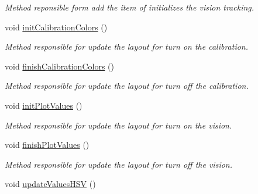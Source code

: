 \begin{DoxyCompactItemize}
\begin{DoxyCompactList}\small\item\em Method reponsible form add the item of initializes the vision tracking. \end{DoxyCompactList}\item 
void \hyperlink{classMainWindow_ab514a3e2e2feb11fe562bb5f5687c260}{init\+Calibration\+Colors} ()\hypertarget{classMainWindow_ab514a3e2e2feb11fe562bb5f5687c260}{}\label{classMainWindow_ab514a3e2e2feb11fe562bb5f5687c260}

\begin{DoxyCompactList}\small\item\em Method responsible for update the layout for turn on the calibration. \end{DoxyCompactList}\item 
void \hyperlink{classMainWindow_aaed408509f0ec209d5113b6d838f223a}{finish\+Calibration\+Colors} ()\hypertarget{classMainWindow_aaed408509f0ec209d5113b6d838f223a}{}\label{classMainWindow_aaed408509f0ec209d5113b6d838f223a}

\begin{DoxyCompactList}\small\item\em Method responsible for update the layout for turn off the calibration. \end{DoxyCompactList}\item 
void \hyperlink{classMainWindow_afe574227eabad29af617957c1c74f11f}{init\+Plot\+Values} ()\hypertarget{classMainWindow_afe574227eabad29af617957c1c74f11f}{}\label{classMainWindow_afe574227eabad29af617957c1c74f11f}

\begin{DoxyCompactList}\small\item\em Method responsible for update the layout for turn on the vision. \end{DoxyCompactList}\item 
void \hyperlink{classMainWindow_a71bb19c8988c81c52cf8856295584ff5}{finish\+Plot\+Values} ()\hypertarget{classMainWindow_a71bb19c8988c81c52cf8856295584ff5}{}\label{classMainWindow_a71bb19c8988c81c52cf8856295584ff5}

\begin{DoxyCompactList}\small\item\em Method responsible for update the layout for turn off the vision. \end{DoxyCompactList}\item 
void \hyperlink{classMainWindow_aee8cb88ae764bcfb12963ab2a1fa9e65}{update\+Values\+H\+SV} ()\hypertarget{classMainWindow_aee8cb88ae764bcfb12963ab2a1fa9e65}{}\label{classMainWindow_aee8cb88ae764bcfb12963ab2a1fa9e65}


\end{DoxyCompactItemize}

